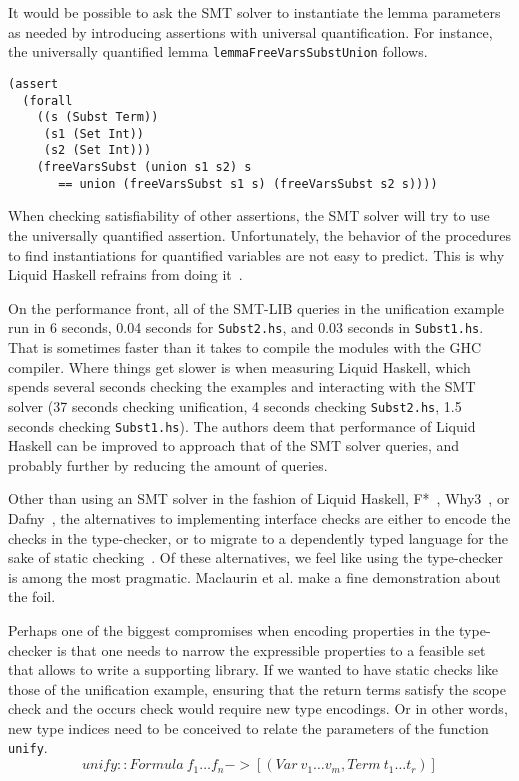 \documentclass[sigconf, anonymous, review]{acmart}
\newcommand{\tc}[1]{{\small\texttt{#1}}}
\begin{document}
It would be possible to ask the SMT solver to instantiate the lemma parameters
as needed by introducing assertions with universal quantification. For instance,
the universally quantified lemma \tc{lemma\-FreeVars\-Subst\-Union} follows.

\begin{verbatim}
(assert
  (forall
    ((s (Subst Term))
     (s1 (Set Int))
     (s2 (Set Int)))
    (freeVarsSubst (union s1 s2) s
       == union (freeVarsSubst s1 s) (freeVarsSubst s2 s))))
\end{verbatim}

When checking satisfiability of other assertions, the SMT solver
will try to use the universally quantified assertion. Unfortunately, the
behavior of the procedures to find instantiations for quantified variables are
not easy to predict. This is why Liquid Haskell refrains from doing it~\cite{vazou13}.

On the performance front, all of the SMT-LIB queries in the unification example run
in 6 seconds, 0.04 seconds for \tc{Subst2.hs}, and 0.03 seconds in \tc{Subst1.hs}.
That is sometimes faster than it takes to compile the modules with the GHC compiler.
Where things get slower is when measuring Liquid
Haskell, which spends several seconds checking the examples and interacting with the
SMT solver (37 seconds checking unification, 4 seconds checking \tc{Subst2.hs},
1.5 seconds checking \tc{Subst1.hs}). The authors deem that performance of Liquid Haskell
can be improved to approach that of the SMT solver queries, and probably further by
reducing the amount of queries.

Other than using an SMT solver in the fashion of Liquid Haskell, F*~\cite{swamy16},
Why3~\cite{filli13}, or Dafny~\cite{leino17},
the alternatives to implementing interface checks are either to encode the checks in
the type-checker, or to migrate to a dependently typed language for the sake of
static checking~\cite{haftmann10, breitner18, carr22}. Of these alternatives,
we feel like using the type-checker is among the most pragmatic. Maclaurin et al. make
a fine demonstration about the foil.

Perhaps one of the biggest compromises when encoding properties in the type-checker
is that one needs to narrow the expressible properties to a feasible set that allows
to write a supporting library. If we wanted to have static checks like those of the
unification example, ensuring that the return terms satisfy the scope check and the
occurs check would require new type encodings. Or in other words, new type indices
need to be conceived to relate the parameters of the function \tc{unify}.
$$\mathit{unify} :: \mathit{Formula}\ f_1 \ldots f_n -> [(\mathit{Var}\ v_1 \ldots v_m, \mathit{Term}\ t_1 \ldots t_r)]$$
\end{document}
